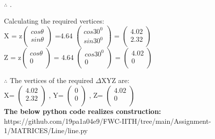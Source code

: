 \documentclass[10pt,a4paper]{report}
\begin{document}
\begin{multicols}{2}
 $\therefore$  .\\ 
\raggedright Calculating the required vertices: \\ \vspace{2mm}
\centering X = z$\begin{pmatrix} 
  cos \theta\\
  sin \theta\\
 \end{pmatrix}$ =4.64 $\begin{pmatrix} 
  cos30^0\\
  sin30^0\\
 \end{pmatrix}$ = $\begin{pmatrix}
                 4.02\\
                 2.32\\
              \end{pmatrix}$ \\ \vspace{2mm}
\centering Z = z$\begin{pmatrix} 
  cos \theta\\
  0\\
 \end{pmatrix}$ = 4.64 $\begin{pmatrix} 
  cos30^0\\
  0\\
 \end{pmatrix}$ = $\begin{pmatrix}
                  4.02\\
                  0\\
              \end{pmatrix}$\\ \vspace{2mm}
\raggedright $\therefore$ The vertices of the required $\Delta$XYZ are:\\ \vspace{2mm}
\centering X= $\begin{pmatrix}
                 4.02\\
                 2.32\\
              \end{pmatrix}$%
              , Y= $\begin{pmatrix}
                 0\\
                 0\\
              \end{pmatrix}$%
               , Z= $\begin{pmatrix}
                  4.02\\
                  0\\
              \end{pmatrix}$%
 \vspace{3mm}             
\\
\textbf{The below python code realizes construction:}\\
https://github.com/19pa1a04e9/FWC-IITH/tree/main/Assignment-1/MATRICES/Line/line.py
  

\end{multicols}
\end{document}
